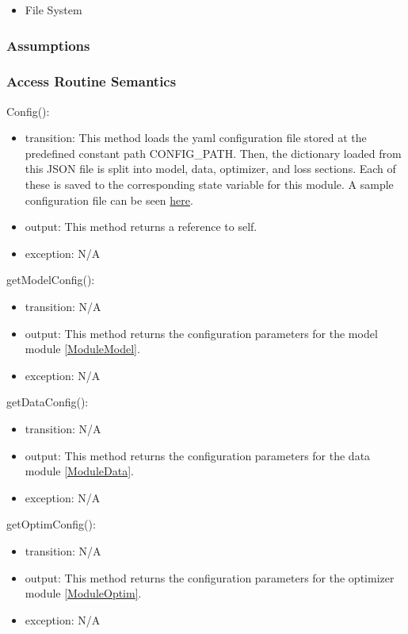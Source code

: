 \documentclass[12pt, titlepage]{article}
\begin{document}
\begin{itemize}
  \item File System
\end{itemize}

\subsubsection{Assumptions}



\subsubsection{Access Routine Semantics}
\noindent Config():
\begin{itemize}
  \item transition: This method loads the yaml configuration file stored at the predefined constant path CONFIG\_PATH. Then, the dictionary loaded from this JSON file is split into model, data, optimizer, and loss sections. Each of these is saved to the corresponding state variable for this module. A sample configuration file can be seen \href{https://github.com/open-mmlab/OpenPCDet/blob/master/tools/cfgs/nuscenes_models/bevfusion.yaml}{here}.
  \item output: This method returns a reference to self.
  \item exception: N/A
\end{itemize}

\noindent getModelConfig():
\begin{itemize}
\item transition: N/A 
\item output: This method returns the configuration parameters for the model module \ref{ModuleModel}.
\item exception: N/A
\end{itemize}

\noindent getDataConfig():
\begin{itemize}
  \item transition: N/A
  \item output: This method returns the configuration parameters for the data module \ref{ModuleData}.
  \item exception: N/A
\end{itemize}

\noindent getOptimConfig():
\begin{itemize}
  \item transition: N/A
  \item output: This method returns the configuration parameters for the optimizer module \ref{ModuleOptim}.
  \item exception: N/A
\end{itemize}
\end{document}
